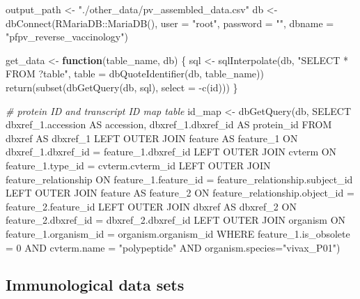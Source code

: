 \documentclass[
  11pt,
  oneside]{book}
\newenvironment{Shaded}{\begin{snugshade}}{\end{snugshade}}
\newcommand{\AttributeTok}[1]{\textcolor[rgb]{0.77,0.63,0.00}{#1}}
\newcommand{\CommentTok}[1]{\textcolor[rgb]{0.56,0.35,0.01}{\textit{#1}}}
\newcommand{\ControlFlowTok}[1]{\textcolor[rgb]{0.13,0.29,0.53}{\textbf{#1}}}
\newcommand{\FunctionTok}[1]{\textcolor[rgb]{0.00,0.00,0.00}{#1}}
\newcommand{\NormalTok}[1]{#1}
\newcommand{\OtherTok}[1]{\textcolor[rgb]{0.56,0.35,0.01}{#1}}
\newcommand{\SpecialCharTok}[1]{\textcolor[rgb]{0.00,0.00,0.00}{#1}}
\newcommand{\StringTok}[1]{\textcolor[rgb]{0.31,0.60,0.02}{#1}}
\begin{document}
\begin{Shaded}
\begin{Highlighting}[]
\NormalTok{output\_path }\OtherTok{\textless{}{-}} \StringTok{"./other\_data/pv\_assembled\_data.csv"}
\NormalTok{db }\OtherTok{\textless{}{-}} \FunctionTok{dbConnect}\NormalTok{(RMariaDB}\SpecialCharTok{::}\FunctionTok{MariaDB}\NormalTok{(), }\AttributeTok{user =} \StringTok{"root"}\NormalTok{, }\AttributeTok{password =} \StringTok{""}\NormalTok{, }\AttributeTok{dbname =} \StringTok{"pfpv\_reverse\_vaccinology"}\NormalTok{)}

\NormalTok{get\_data }\OtherTok{\textless{}{-}} \ControlFlowTok{function}\NormalTok{(table\_name, db) \{}
\NormalTok{  sql }\OtherTok{\textless{}{-}} \FunctionTok{sqlInterpolate}\NormalTok{(db, }\StringTok{"SELECT * FROM ?table"}\NormalTok{, }\AttributeTok{table =} \FunctionTok{dbQuoteIdentifier}\NormalTok{(db, table\_name))}
  \FunctionTok{return}\NormalTok{(}\FunctionTok{subset}\NormalTok{(}\FunctionTok{dbGetQuery}\NormalTok{(db, sql), }\AttributeTok{select =} \SpecialCharTok{{-}}\FunctionTok{c}\NormalTok{(id)))}
\NormalTok{\}}

\CommentTok{\# protein ID and transcript ID map table}
\NormalTok{id\_map }\OtherTok{\textless{}{-}} \FunctionTok{dbGetQuery}\NormalTok{(db, }\StringTok{\textquotesingle{}SELECT dbxref\_1.accession AS accession, dbxref\_1.dbxref\_id AS protein\_id FROM dbxref AS dbxref\_1}
\StringTok{                         LEFT OUTER JOIN feature AS feature\_1 ON dbxref\_1.dbxref\_id = feature\_1.dbxref\_id}
\StringTok{                         LEFT OUTER JOIN cvterm ON feature\_1.type\_id = cvterm.cvterm\_id}
\StringTok{                         LEFT OUTER JOIN feature\_relationship ON feature\_1.feature\_id = feature\_relationship.subject\_id}
\StringTok{                         LEFT OUTER JOIN feature AS feature\_2 ON feature\_relationship.object\_id = feature\_2.feature\_id}
\StringTok{                         LEFT OUTER JOIN dbxref AS dbxref\_2 ON feature\_2.dbxref\_id = dbxref\_2.dbxref\_id}
\StringTok{                         LEFT OUTER JOIN organism ON feature\_1.organism\_id = organism.organism\_id}
\StringTok{                         WHERE feature\_1.is\_obsolete = 0 AND cvterm.name = "polypeptide" AND organism.species="vivax\_P01"\textquotesingle{}}\NormalTok{)}
\end{Highlighting}
\end{Shaded}

\hypertarget{immunological-data-sets}{%
\subsection{Immunological data sets}\label{immunological-data-sets}}
\end{document}
